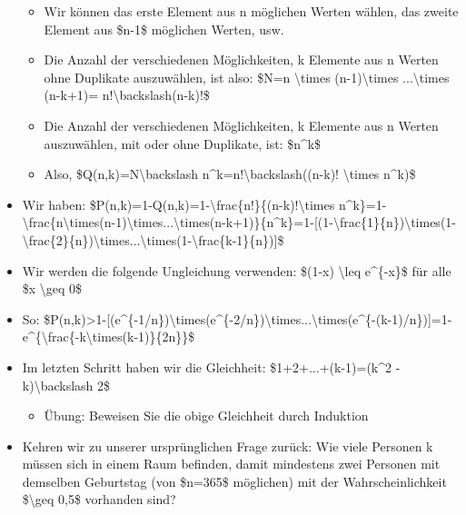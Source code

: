 \documentclass[a4paper]{article}
\begin{document}
\begin{multicols}{3}
\begin{itemize}
              \begin{itemize}
                  \item
                        Wir können das erste Element aus n möglichen Werten wählen, das
                        zweite Element aus \$n-1\$ möglichen Werten, usw.
                  \item
                        Die Anzahl der verschiedenen Möglichkeiten, k Elemente aus n Werten
                        ohne Duplikate auszuwählen, ist also: \$N=n \textbackslash times
                        (n-1)\textbackslash times ...\textbackslash times (n-k+1)=
                        n!\textbackslash backslash(n-k)!\$
                  \item
                        Die Anzahl der verschiedenen Möglichkeiten, k Elemente aus n Werten
                        auszuwählen, mit oder ohne Duplikate, ist: \$n\^{}k\$
                  \item
                        Also, \$Q(n,k)=N\textbackslash backslash
                        n\^{}k=n!\textbackslash backslash((n-k)! \textbackslash times
                        n\^{}k)\$
              \end{itemize}
        \item
              Wir haben:
              \$P(n,k)=1-Q(n,k)=1-\textbackslash frac\{n!\}\{(n-k)!\textbackslash times
              n\^{}k\}=1-\textbackslash frac\{n\textbackslash times(n-1)\textbackslash times...\textbackslash times(n-k+1)\}\{n\^{}k\}=1-{[}(1-\textbackslash frac\{1\}\{n\})\textbackslash times(1-\textbackslash frac\{2\}\{n\})\textbackslash times...\textbackslash times(1-\textbackslash frac\{k-1\}\{n\}){]}\$
        \item
              Wir werden die folgende Ungleichung verwenden: \$(1-x)
              \textbackslash leq e\^{}\{-x\}\$ für alle \$x \textbackslash geq 0\$
        \item
              So:
              \$P(n,k)\textgreater1-{[}(e\^{}\{-1/n\})\textbackslash times(e\^{}\{-2/n\})\textbackslash times...\textbackslash times(e\^{}\{-(k-1)/n\}){]}=1-e\^{}\{\textbackslash frac\{-k\textbackslash times(k-1)\}\{2n\}\}\$
        \item
              Im letzten Schritt haben wir die Gleichheit: \$1+2+...+(k-1)=(k\^{}2 -
              k)\textbackslash backslash 2\$

              \begin{itemize}
                  \item
                        Übung: Beweisen Sie die obige Gleichheit durch Induktion
              \end{itemize}
        \item
              Kehren wir zu unserer ursprünglichen Frage zurück: Wie viele Personen
              k müssen sich in einem Raum befinden, damit mindestens zwei Personen
              mit demselben Geburtstag (von \$n=365\$ möglichen) mit der
              Wahrscheinlichkeit \$\textbackslash geq 0,5\$ vorhanden sind?


\end{itemize}
\end{multicols}
\end{document}
